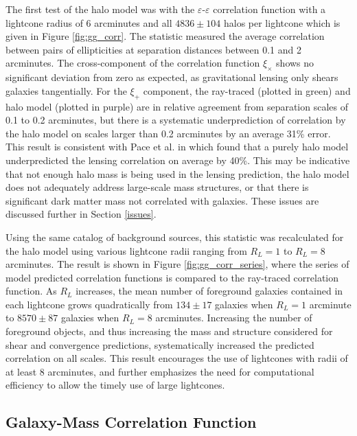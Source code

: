 \documentclass[%
 reprint,
 amsmath,amssymb,
 aps,nofootinbib
]{revtex4-1}
\begin{document}
The first test of the halo model was with the $\varepsilon$-$\varepsilon$ correlation function with a lightcone radius of 6 arcminutes and all $4836\pm104$ halos per lightcone which is given in Figure \ref{fig:gg_corr}. The statistic measured the average correlation between pairs of ellipticities at separation distances between 0.1 and 2 arcminutes. The cross-component of the correlation function $\xi_\times$ shows no significant deviation from zero as expected, as gravitational lensing only shears galaxies tangentially. For the $\xi_+$ component, the ray-traced (plotted in green) and halo model (plotted in purple) are in relative agreement from separation scales of 0.1 to 0.2 arcminutes, but there is a systematic underprediction of correlation by the halo model on scales larger than 0.2 arcminutes by an average 31\% error. This result is consistent with Pace et al. in \cite{pace} which found that a purely halo model underpredicted the lensing correlation on average by 40\%. This may be indicative that not enough halo mass is being used in the lensing prediction, the halo model does not adequately address large-scale mass structures, or that there is significant dark matter mass not correlated with galaxies.  These issues are discussed further in Section \ref{issues}.

Using the same catalog of background sources, this statistic was recalculated for the halo model using various lightcone radii ranging from $R_L=1$ to $R_L=8$ arcminutes. The result is shown in Figure \ref{fig:gg_corr_series}, where the series of model predicted correlation functions is compared to the ray-traced correlation function. As $R_L$ increases, the mean number of foreground galaxies contained in each lightcone grows quadratically from ${134\pm17}$ galaxies when $R_L=1$ arcminute to ${8570\pm87}$ galaxies when $R_L=8$ arcminutes. Increasing the number of foreground objects, and thus increasing the mass and structure considered for shear and convergence predictions, systematically increased the predicted correlation on all scales. This result encourages the use of lightcones with radii of at least 8 arcminutes, and further emphasizes the need for computational efficiency to allow the timely use of large lightcones.


\subsection{Galaxy-Mass Correlation Function}
\end{document}
